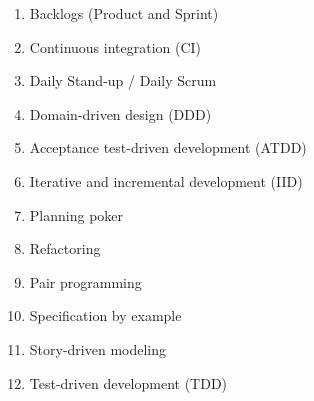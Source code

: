    \begin{enumerate}
        \item Backlogs (Product and Sprint)
        \item Continuous integration (CI)
        \item Daily Stand-up / Daily Scrum
        \item Domain-driven design (DDD)
        \item Acceptance test-driven development (ATDD)
        \item Iterative and incremental development (IID)
        \item Planning poker
        \item Refactoring
        \item Pair programming
        \item Specification by example
        \item Story-driven modeling
        \item Test-driven development (TDD)
    \end{enumerate}

